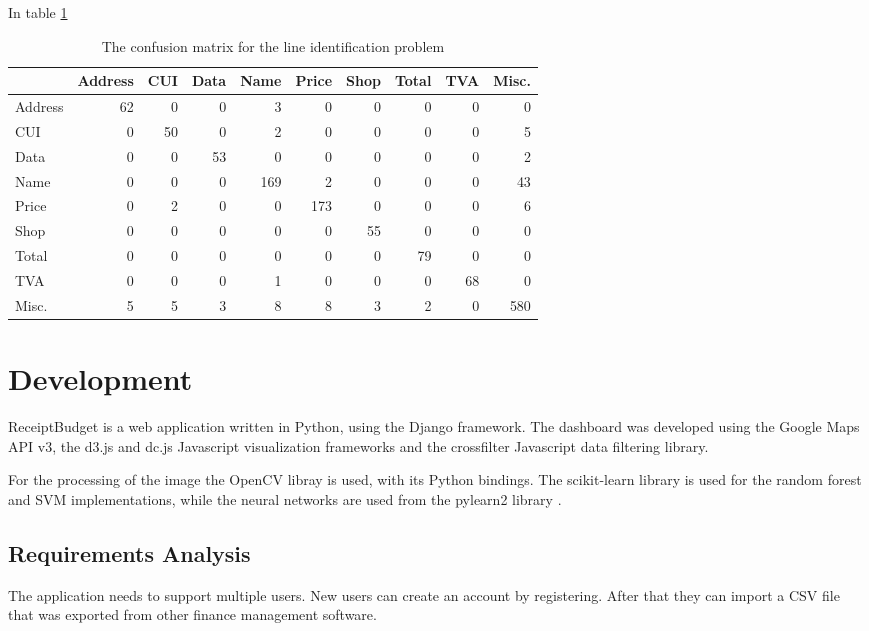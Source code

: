 In table \ref{table:line_identify}
\begin{table}[h]
\caption{The confusion matrix for the line identification problem}
\label{table:line_identify}
\begin{tabular}{lrrrrrrrrr}
\toprule
{} &  Address &  CUI &  Data &  Name &  Price &  Shop &  Total &  TVA &  Misc. \\
\midrule
Address &       62 &    0 &     0 &     3 &      0 &     0 &      0 &    0 &        0 \\
CUI     &        0 &   50 &     0 &     2 &      0 &     0 &      0 &    0 &        5 \\
Data    &        0 &    0 &    53 &     0 &      0 &     0 &      0 &    0 &        2 \\
Name    &        0 &    0 &     0 &   169 &      2 &     0 &      0 &    0 &       43 \\
Price   &        0 &    2 &     0 &     0 &    173 &     0 &      0 &    0 &        6 \\
Shop    &        0 &    0 &     0 &     0 &      0 &    55 &      0 &    0 &        0 \\
Total   &        0 &    0 &     0 &     0 &      0 &     0 &     79 &    0 &        0 \\
TVA     &        0 &    0 &     0 &     1 &      0 &     0 &      0 &   68 &        0 \\
Misc.   &        5 &    5 &     3 &     8 &      8 &     3 &      2 &    0 &      580 \\
\bottomrule
\end{tabular}
\end{table}

\section{Development}

ReceiptBudget is a web application written in Python, using the Django framework. The dashboard was developed using the Google Maps API v3, the d3.js and dc.js Javascript visualization frameworks and the crossfilter Javascript data filtering library. 

For the processing of the image the OpenCV libray is used, with its Python bindings. The scikit-learn library \cite{pedregosa2011scikit} is used for the random forest and SVM implementations, while the neural networks are used from the pylearn2 library \cite{goodfellow2013pylearn2}. 
\subsection{Requirements Analysis}
The application needs to support multiple users. New users can create an account by registering. After that they can import a CSV file that was exported from other finance management software. 


